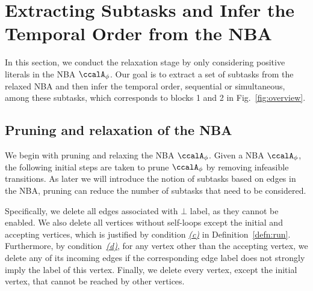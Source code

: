 \documentclass[Afour,sageh,times]{sagej}
\newcommand{\autop}{\ccalA_{\phi}}
\begin{document}
{   


\section{Extracting Subtasks and Infer the Temporal Order from the NBA}\label{sec:app}
In this section, we conduct the relaxation stage by only considering positive literals in the NBA $\autop$. Our goal is to extract a set of subtasks from the relaxed NBA  and then infer the temporal order, sequential or simultaneous, among these subtasks, which corresponds to blocks 1 and 2 in Fig.~\ref{fig:overview}.
\subsection{{Pruning and relaxation of the NBA}}\label{sec:prune}

We begin with pruning and relaxing the NBA $\autop$. Given a NBA $\autop$, the following initial steps are taken to prune $\autop$ by  removing infeasible transitions. As later we will introduce the notion of subtasks based on edges in the NBA, pruning can reduce the number of subtasks that need to be considered.

Specifically, we delete all edges associated with $\bot$ label, as they cannot be enabled.  We also delete all vertices without self-loops except the initial and accepting vertices, which is justified by condition \hyperref[cond:c]{\it (c)} in Definition~\ref{defn:run}. Furthermore, by condition~\hyperref[cond:d]{\it (d)}, for any vertex other than the accepting vertex, we delete any of its incoming edges if the corresponding edge label does not strongly imply the label of this vertex. Finally, we delete every vertex, except the initial vertex, that cannot be reached by other vertices.

}
\end{document}
